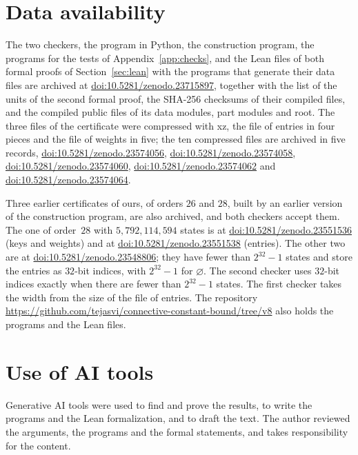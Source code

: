 \documentclass[11pt]{amsart}
\theoremstyle{definition}
\theoremstyle{remark}
\numberwithin{equation}{section}
\newcommand{\OldSuppDOI}{10.5281/zenodo.23548806}
\newcommand{\FSuppDOI}{10.5281/zenodo.23551536}
\newcommand{\FDataDOI}{10.5281/zenodo.23551538}
\newcommand{\SUPPDOI}{10.5281/zenodo.23715897}
\newcommand{\DataA}{10.5281/zenodo.23574056}
\newcommand{\DataB}{10.5281/zenodo.23574058}
\newcommand{\DataC}{10.5281/zenodo.23574060}
\newcommand{\DataD}{10.5281/zenodo.23574062}
\newcommand{\DataE}{10.5281/zenodo.23574064}
\newcommand{\REPOURL}{https://github.com/tejasvi/connective-constant-bound/tree/v8}
\newcommand{\COMMITREF}{}   %
\begin{document}
\section*{Data availability}
\begingroup\sloppy
The two checkers, the program in Python, the construction program, the programs for the tests of Appendix~\ref{app:checks}, and the Lean files of both formal proofs of Section~\ref{sec:lean} with the programs that generate their data files are archived at \href{https://doi.org/\SUPPDOI}{doi:\SUPPDOI}, together with the list of the units of the second formal proof, the SHA-256 checksums of their compiled files, and the compiled public files of its data modules, part modules and root. The three files of the certificate were compressed with xz, the file of entries in four pieces and the file of weights in five; the ten compressed files are archived in five records, \href{https://doi.org/\DataA}{doi:\DataA}, \href{https://doi.org/\DataB}{doi:\DataB}, \href{https://doi.org/\DataC}{doi:\DataC}, \href{https://doi.org/\DataD}{doi:\DataD} and \href{https://doi.org/\DataE}{doi:\DataE}.

Three earlier certificates of ours, of orders $26$ and $28$, built by an earlier version of the construction program, are also archived, and both checkers accept them. The one of order~$28$ with $5{,}792{,}114{,}594$ states is at \href{https://doi.org/\FSuppDOI}{doi:\FSuppDOI} (keys and weights) and at \href{https://doi.org/\FDataDOI}{doi:\FDataDOI} (entries). The other two are at \href{https://doi.org/\OldSuppDOI}{doi:\OldSuppDOI}; they have fewer than $2^{32}-1$ states and store the entries as $32$-bit indices, with $2^{32}-1$ for $\varnothing$. The second checker uses $32$-bit indices exactly when there are fewer than $2^{32}-1$ states. The first checker takes the width from the size of the file of entries. The repository \url{\REPOURL}\COMMITREF{} also holds the programs and the Lean files.\par\endgroup

\section*{Use of AI tools}
Generative AI tools were used to find and prove the results, to write the programs and the Lean formalization, and to draft the text. The author reviewed the arguments, the programs and the formal statements, and takes responsibility for the content.
\end{document}
